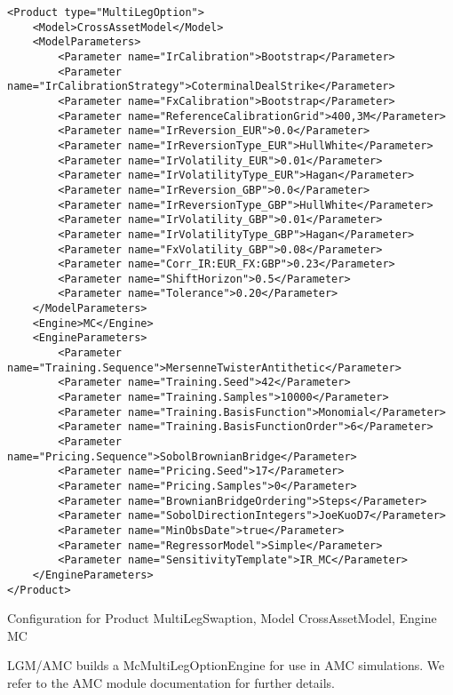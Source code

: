 \begin{longlisting}
\begin{verbatim}
<Product type="MultiLegOption">
    <Model>CrossAssetModel</Model>
    <ModelParameters>
        <Parameter name="IrCalibration">Bootstrap</Parameter>
        <Parameter name="IrCalibrationStrategy">CoterminalDealStrike</Parameter>
        <Parameter name="FxCalibration">Bootstrap</Parameter>
        <Parameter name="ReferenceCalibrationGrid">400,3M</Parameter>
        <Parameter name="IrReversion_EUR">0.0</Parameter>
        <Parameter name="IrReversionType_EUR">HullWhite</Parameter>
        <Parameter name="IrVolatility_EUR">0.01</Parameter>
        <Parameter name="IrVolatilityType_EUR">Hagan</Parameter>
        <Parameter name="IrReversion_GBP">0.0</Parameter>
        <Parameter name="IrReversionType_GBP">HullWhite</Parameter>
        <Parameter name="IrVolatility_GBP">0.01</Parameter>
        <Parameter name="IrVolatilityType_GBP">Hagan</Parameter>
        <Parameter name="FxVolatility_GBP">0.08</Parameter>
        <Parameter name="Corr_IR:EUR_FX:GBP">0.23</Parameter>
        <Parameter name="ShiftHorizon">0.5</Parameter>
        <Parameter name="Tolerance">0.20</Parameter>
    </ModelParameters>
    <Engine>MC</Engine>
    <EngineParameters>
        <Parameter name="Training.Sequence">MersenneTwisterAntithetic</Parameter>
        <Parameter name="Training.Seed">42</Parameter>
        <Parameter name="Training.Samples">10000</Parameter>
        <Parameter name="Training.BasisFunction">Monomial</Parameter>
        <Parameter name="Training.BasisFunctionOrder">6</Parameter>
        <Parameter name="Pricing.Sequence">SobolBrownianBridge</Parameter>
        <Parameter name="Pricing.Seed">17</Parameter>
        <Parameter name="Pricing.Samples">0</Parameter>
        <Parameter name="BrownianBridgeOrdering">Steps</Parameter>
        <Parameter name="SobolDirectionIntegers">JoeKuoD7</Parameter>
        <Parameter name="MinObsDate">true</Parameter>
        <Parameter name="RegressorModel">Simple</Parameter>
        <Parameter name="SensitivityTemplate">IR_MC</Parameter>
    </EngineParameters>
</Product>
\end{verbatim}
\caption{Configuration for Product MultiLegSwaption, Model CrossAssetModel, Engine MC}
\label{lst:peconfig_MultiLegOption_CrossAssetModel_MC}
\end{longlisting}

LGM/AMC builds a McMultiLegOptionEngine for use in AMC simulations. We refer to the AMC module documentation for further
details.

